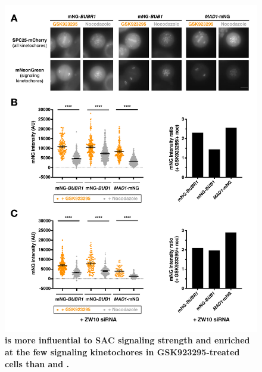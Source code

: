 \begin{figure}
    \centering
    \includegraphics[width=\textwidth]{chapters/figures/SACProteinKinetochoreRecruitment.pdf}
    \caption{\textbf{ is more influential to SAC signaling strength and enriched at the few signaling kinetochores in GSK923295-treated cells than  and .}}

\end{figure}
